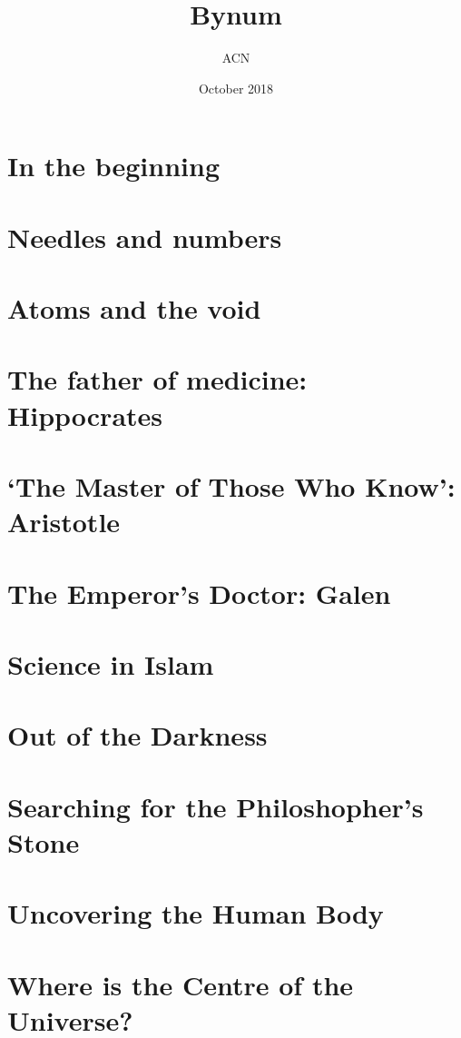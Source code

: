 \documentclass[a4paper,11pt]{article}
\title{Bynum}
\author{ACN}
\date{October 2018}
\begin{document}
\maketitle

\section{In the beginning}

\section{Needles and numbers}

\section{Atoms and the void}

\section{The father of medicine: Hippocrates}

\section{`The Master of Those Who Know': Aristotle}

\section{The Emperor's Doctor: Galen}

\section{Science in Islam}
	
\section{Out of the Darkness}

\section{Searching for the Philoshopher's Stone}

\section{Uncovering the Human Body}

\section{Where is the Centre of the Universe?}
\end{document}
